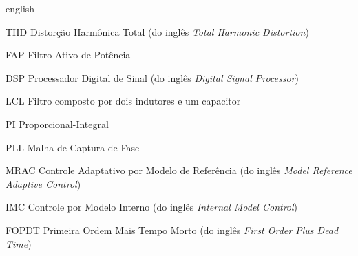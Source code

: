 \documentclass[12pt,openright,twoside,a4paper,english,french,spanish,
                sumario=tradicional,brazil]{abntex2}
\begin{document}

\begin{resumo}
 
\end{resumo}

\begin{resumo}[Abstract]
 \begin{otherlanguage*}{english}
  
 \end{otherlanguage*}
\end{resumo}

\listoffigures*
\cleardoublepage

\listoftables*
\cleardoublepage

\begin{siglas}
 \item[THD]  Distorção Harmônica Total (do inglês \emph{Total Harmonic Distortion})
 \item[FAP]  Filtro Ativo de Potência
 \item[DSP]  Processador Digital de Sinal (do inglês \emph{Digital Signal Processor})
 \item[LCL]  Filtro composto por dois indutores e um capacitor
 \item[PI]   Proporcional-Integral
 \item[PLL]  Malha de Captura de Fase
 \item[MRAC] Controle Adaptativo por Modelo de Referência (do inglês \emph{Model Reference Adaptive Control})
 \item[IMC] Controle por Modelo Interno (do inglês \emph{Internal Model Control})
 \item[FOPDT] Primeira Ordem Mais Tempo Morto (do inglês \emph{First Order Plus Dead Time})
\end{siglas}
\end{document}
